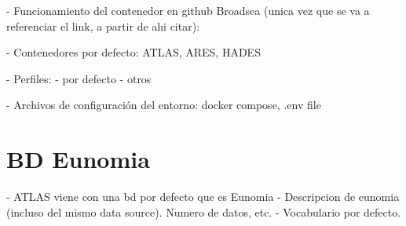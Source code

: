 - Funcionamiento del contenedor en github Broadsea (unica vez que se va a referenciar el link, a partir de ahi citar):

- Contenedores por defecto: ATLAS, ARES, HADES

- Perfiles:
        - por defecto
        - otros

- Archivos de configuración del entorno: docker compose, .env file

\section{BD Eunomia}

- ATLAS viene con una bd por defecto que es Eunomia
- Descripcion de eunomia (incluso del mismo data source). Numero de datos, etc.
- Vocabulario por defecto.


